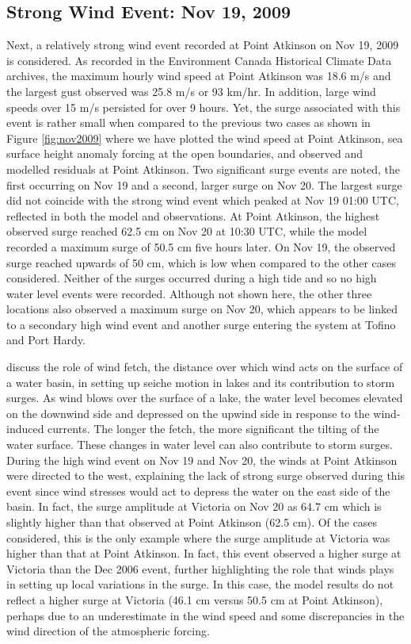 \documentclass[pdftex,10pt]{article}
\begin{document}
\subsection{Strong Wind Event: Nov 19, 2009}
Next, a relatively strong wind event recorded at Point Atkinson on Nov 19, 2009 is considered. As recorded in the Environment Canada Historical Climate Data archives, the maximum hourly wind speed at Point Atkinson was 18.6 m/s and the largest gust observed was 25.8 m/s or 93 km/hr. In addition, large wind speeds over 15 m/s persisted for over 9 hours. Yet, the surge associated with this event is rather small when compared to the previous two cases as shown in Figure \ref{fig:nov2009} where we have plotted the wind speed at Point Atkinson, sea surface height anomaly forcing at the open boundaries, and observed and modelled residuals at Point Atkinson. Two significant surge events are noted, the first occurring on Nov 19 and a second, larger surge on Nov 20. The largest surge did not coincide with the strong wind event which peaked at Nov 19 01:00 UTC, reflected in both the model and observations. At Point Atkinson, the highest observed surge reached 62.5 cm on Nov 20 at 10:30 UTC, while the model recorded a maximum surge of 50.5 cm five hours later. On Nov 19, the observed surge reached upwards of 50 cm, which is low when compared to the other cases considered. Neither of the surges occurred during a high tide and so no high water level events were recorded. Although not shown here, the other three locations also observed a maximum surge on Nov 20, which appears to be linked to a secondary high wind event and another surge entering the system at Tofino and Port Hardy. 

\citet{danard2003storm} discuss the role of wind fetch, the distance over which wind acts on the surface of a water basin, in setting up seiche motion in lakes and its contribution to storm surges. As wind blows over the surface of a lake, the water level becomes elevated on the downwind side and depressed on the upwind side in response to the wind-induced currents. The longer the fetch, the more significant the tilting of the water surface. These changes in water level can also contribute to storm surges.  During the high wind event on Nov 19 and Nov 20, the winds at Point Atkinson were directed to the west, explaining the lack of strong surge observed during this event since wind stresses would act to depress the water on the east side of the basin. In fact, the surge amplitude at Victoria on Nov 20 as 64.7 cm which is slightly higher than that observed at Point Atkinson (62.5 cm). Of the cases considered, this is the only example where the surge amplitude at Victoria was higher than that at Point Atkinson. In fact, this event observed a higher surge at Victoria than the Dec 2006 event, further highlighting the role that winds plays in setting up local variations in the surge. In this case, the model results do not reflect a higher surge at Victoria (46.1 cm versus 50.5 cm at Point Atkinson), perhaps due to an underestimate in the wind speed and some discrepancies in the wind direction of the atmospheric forcing.  
\end{document}
